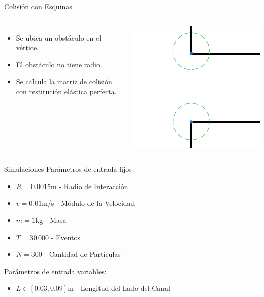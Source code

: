 \documentclass{beamer}
\begin{document}
\begin{frame}{Colisión con Esquinas}
    \begin{columns}[c]
            \begin{itemize}
                \item Se ubica un obstáculo en el vértice.
                \item El obstáculo no tiene radio.
                \item Se calcula la matriz de colisión con restitución elástica perfecta.
            \end{itemize}
            \centering
            \includegraphics[width=\linewidth]{resources/bordes.png}
    \end{columns}
\end{frame}

\begin{frame}{Simulaciones}
    Parámetros de entrada fijos:
    \begin{itemize}
        \item $R=0.0015$m - Radio de Interacción
        \item $v=0.01$m/s - Módulo de la Velocidad
        \item $m=1$kg - Masa
        \item $T=30\,000$ - Eventos
        \item $N=300$ - Cantidad de Partículas
    \end{itemize}
    Parámetros de entrada variables:
    \begin{itemize}
        \item $L\in[0.03, 0.09]$m - Longitud del Lado del Canal
    \end{itemize}
\end{frame}
\end{document}
